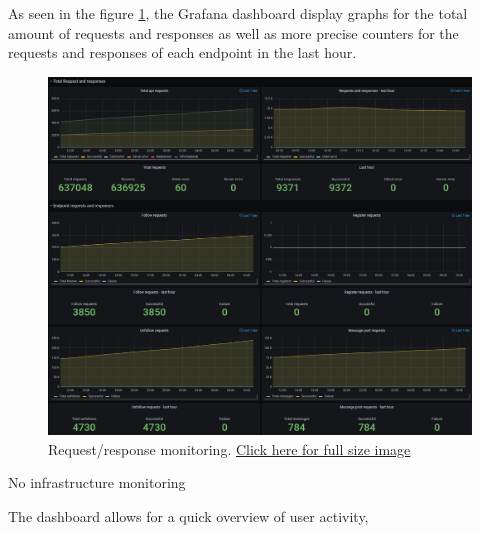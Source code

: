 
As seen in the figure \ref{fig:Monitoring1}, the Grafana dashboard display graphs for the total amount of requests and responses as well as more precise counters for the requests and responses of each endpoint in the last hour.

\begin{figure}[H]
    \centering
    \includegraphics[width=1\textwidth]{report/images/MonitoringRequest.png}
    \caption{Request/response monitoring. \href{https://github.com/Niels-Frederik/MiniTwit/blob/main/report/images/MonitoringRequest.png}{Click here for full size image}}
    \label{fig:Monitoring1}
\end{figure}


No infrastructure monitoring



The dashboard allows for a quick overview of user activity, 



